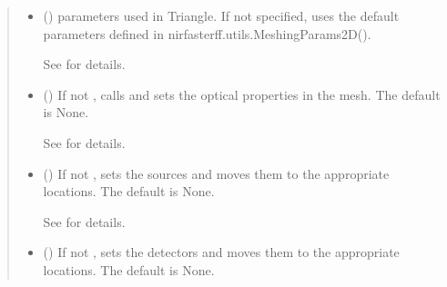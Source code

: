 \documentclass[letterpaper,10pt,english]{sphinxmanual}
\begin{document}
\begin{fulllineitems}
\begin{fulllineitems}
\begin{quote}
\begin{description}
\begin{itemize}
\item {} 
\sphinxAtStartPar
{} ({\hyperref[\detokenize{_autosummary/nirfasterff.utils.MeshingParams2D:nirfasterff.utils.MeshingParams2D}]{}}\sphinxstyleliteralemphasis{\sphinxupquote{, }}) \textendash{} 
\sphinxAtStartPar
parameters used in Triangle. If not specified, uses the default parameters defined in nirfasterff.utils.MeshingParams2D().

\sphinxAtStartPar
See {\hyperref[\detokenize{_autosummary/nirfasterff.utils.MeshingParams2D:nirfasterff.utils.MeshingParams2D}]{}} for details.


\item {} 
\sphinxAtStartPar
{} (\sphinxstyleliteralemphasis{\sphinxupquote{, }}) \textendash{} 
\sphinxAtStartPar
If not , calls  and sets the optical properties in the mesh. The default is None.

\sphinxAtStartPar
See {\hyperref[\detokenize{_autosummary/nirfasterff.base.dcs_mesh.dcsmesh:nirfasterff.base.dcs_mesh.dcsmesh.set_prop}]{}} for details.


\item {} 
\sphinxAtStartPar
{} (\sphinxstyleliteralemphasis{\sphinxupquote{, }}) \textendash{} 
\sphinxAtStartPar
If not , sets the sources and moves them to the appropriate locations. The default is None.

\sphinxAtStartPar
See {\hyperref[\detokenize{_autosummary/nirfasterff.base.optodes.optode:nirfasterff.base.optodes.optode.touch_sources}]{}} for details.


\item {} 
\sphinxAtStartPar
{} (\sphinxstyleliteralemphasis{\sphinxupquote{, }}) \textendash{} 
\sphinxAtStartPar
If not , sets the detectors and moves them to the appropriate locations. The default is None.


\end{itemize}
\end{description}
\end{quote}
\end{fulllineitems}
\end{fulllineitems}
\end{document}
